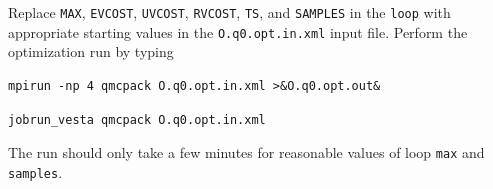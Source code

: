 Replace \texttt{MAX}, \texttt{EVCOST}, \texttt{UVCOST}, \texttt{RVCOST}, \texttt{TS}, and \texttt{SAMPLES} in the \texttt{loop} with appropriate starting values in the \texttt{O.q0.opt.in.xml} input file.  Perform the optimization run by typing
\ifws
\begin{shaded}
\begin{verbatim}
mpirun -np 4 qmcpack O.q0.opt.in.xml >&O.q0.opt.out&
\end{verbatim}
\end{shaded}
\else
\begin{shaded}
\begin{verbatim}
jobrun_vesta qmcpack O.q0.opt.in.xml
\end{verbatim}
\end{shaded}
\fi
\noindent
The run should only take a few minutes for reasonable values of loop \texttt{max} and \texttt{samples}.  

